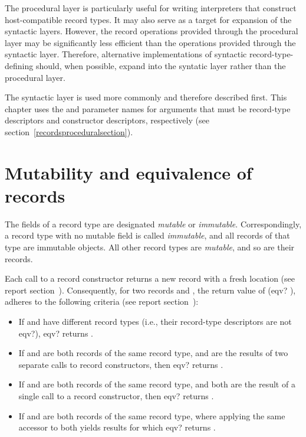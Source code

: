 The procedural layer is particularly useful for writing interpreters
that construct host-compatible record types.  It may also serve as a
target for expansion of the syntactic layers.  However, the
record operations provided through the procedural layer may be
significantly less efficient than the operations provided through the
syntactic layer.  Therefore, alternative implementations
of syntactic record-type-defining should, when possible, expand into
the syntatic layer rather than the procedural layer.

The syntactic layer is used more commonly and therefore described
first.  This chapter uses the  and
 parameter names for arguments that must
be record-type descriptors and constructor descriptors, respectively
(see section~\ref{recordsproceduralsection}).

\section{Mutability and equivalence of records}
\label{recordsequivalencesection}

The fields of a record type are designated \textit{mutable} or
\textit{immutable}.  Correspondingly, a record type with no mutable
field is called \textit{immutable}, and all records of that type
are immutable objects.  All other record types are \textit{mutable},
and so are their records.

Each call to a record constructor returns a new record with a fresh
location (see report section~).  Consequently, for two records  and ,
the return value of {\cf (eqv?  )}, adheres to
the following criteria (see report
section~):

\begin{itemize}
\item If  and  have different record types (i.e.,
  their record-type descriptors are not {\cf eqv?}), {\cf eqv?}
  returns \schfalse.
\item If  and  are both records of the
  same record type, and are the results of two separate calls to
  record constructors, then {\cf eqv?} returns \schfalse.
\item If  and  are both records of the
  same record type, and both are the result of a single call to a
  record constructor, then {\cf eqv?} returns \schtrue.
\item If  and  are both records of the same
  record type, where applying the same accessor to both yields results
  for which {\cf eqv?} returns \schfalse.
\end{itemize}


